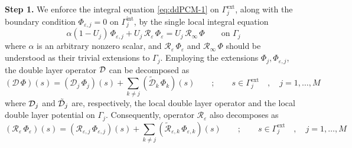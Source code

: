 {\bf Step 1.} 
We enforce the integral equation \eqref{eq:ddPCM-1} on $\Gamma_j^\text{ext}$, along with the boundary condition $\Phi_{\varepsilon,j}=0$ on $\Gamma_j^\text{int}$, by the single local integral equation
\begin{equation}
	\label{eq:ddPCM_aux1}
	\alpha(1 - U_j)\,\Phi_{\varepsilon,j} + U_j \, {\mathcal{R}}_{\varepsilon} \, \Phi_{\varepsilon} = U_j \, {\mathcal{R}}_{\infty} \, \Phi \qquad \text{on }\Gamma_j
\end{equation}
where $\alpha$ is an arbitrary nonzero scalar, and ${\mathcal{R}}_{\varepsilon} \, \Phi_{\varepsilon}$ and $ {\mathcal{R}}_{\infty} \, \Phi$ should be understood as their trivial extensions to $\Gamma_j$. Employing the extensions $\Phi_j , \Phi_{\varepsilon,j}$, the double layer operator $\mathcal{D}$ can be decomposed as
\[
(\mathcal{D} \, \Phi ) (s) = ( \mathcal{D}_j \, \Phi_j )(s) + \sum_{k \ne j} (\tilde{\mathcal{D}}_k \, \Phi_k )(s) \qquad ; \qquad s \in \Gamma_j^\text{ext} \quad, \quad  j = 1 , \ldots , M
\]
where $\mathcal{D}_j$ and $\tilde{\mathcal{D}}_j$ are, respectively, the local double layer operator and the local double layer potential on $\Gamma_j$. Consequently, operator ${\mathcal{R}}_{\varepsilon}$ also decomposes as
\begin{equation}\label{eq:PCM_aux2}
({\mathcal{R}}_{\varepsilon} \, \Phi_{\varepsilon})(s)
=
({\mathcal{R}}_{\varepsilon,j} \, \Phi_{\varepsilon,j})(s) + \sum_{k \ne j} (\tilde{\mathcal{R}}_{\varepsilon,k} \, \Phi_{\varepsilon,k})(s)
 \qquad ; \qquad s \in \Gamma_j^\text{ext} \quad, \quad  j = 1 , \ldots , M
\end{equation}
